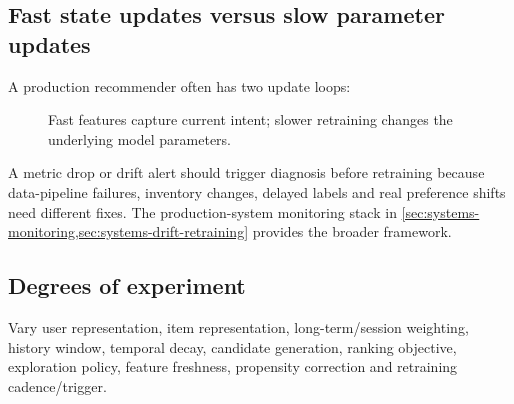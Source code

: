 \subsection{Fast state updates versus slow parameter updates}
\label{sec:personalisation-streaming-retraining}
A production recommender often has two update loops:

\begin{figure}[htbp]
\centering
{}
\caption{Fast features capture current intent; slower retraining changes the underlying model parameters.}
\end{figure}

A metric drop or drift alert should trigger diagnosis before retraining because data-pipeline failures, inventory changes, delayed labels and real preference shifts need different fixes.
The production-system monitoring stack in \cref{sec:systems-monitoring,sec:systems-drift-retraining} provides the broader framework.

\subsection{Degrees of experiment}
\label{sec:personalisation-optionality}
\begin{calloutdegreeofexperiment}
Vary user representation, item representation, long-term/session weighting, history window, temporal decay, candidate generation, ranking objective, exploration policy, feature freshness, propensity correction and retraining cadence/trigger.
\end{calloutdegreeofexperiment}


